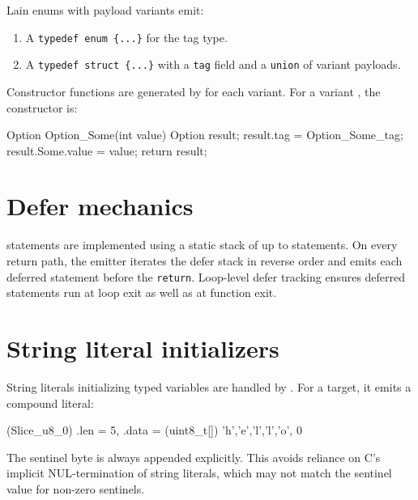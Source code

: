 \pnum
Lain enums with payload variants emit:
\begin{enumerate}
\item A \texttt{typedef enum \{...\}} for the tag type.
\item A \texttt{typedef struct \{...\}} with a \texttt{tag} field and a
  \texttt{union} of variant payloads.
\end{enumerate}

\pnum
Constructor functions are generated by  for each variant.
For a variant , the constructor is:

\begin{gencode}
Option Option_Some(int value) {
    Option result;
    result.tag = Option_Some_tag;
    result.Some.value = value;
    return result;
}
\end{gencode}

\section{Defer mechanics}
\label{sec:gen-defer}

\pnum
{} statements are implemented using a static stack of up to
 statements.  On every return path, the emitter
iterates the defer stack in reverse order and emits each deferred statement
before the \texttt{return}.  Loop-level defer tracking ensures deferred
statements run at loop exit as well as at function exit.

\section{String literal initializers}
\label{sec:gen-strings}

\pnum
String literals initializing typed variables are handled by
.  For a  target, it emits a
compound literal:

\begin{gencode}
(Slice_u8_0){ .len = 5, .data = (uint8_t[]){ 'h','e','l','l','o', 0 } }
\end{gencode}

\pnum
The sentinel byte is always appended explicitly.  This avoids reliance on
C's implicit NUL-termination of string literals, which may not match the
sentinel value for non-zero sentinels.
